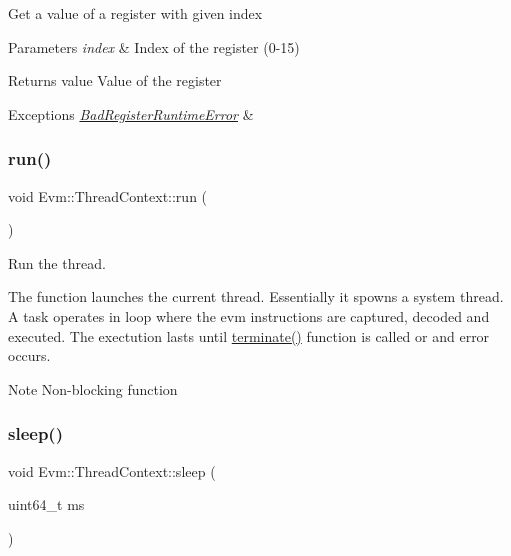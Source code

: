 Get a value of a register with given index 
\begin{DoxyParams}{Parameters}
{\em index} & Index of the register (0-\/15) \\
\hline
\end{DoxyParams}
\begin{DoxyReturn}{Returns}
value Value of the register 
\end{DoxyReturn}

\begin{DoxyExceptions}{Exceptions}
{\em \mbox{\hyperlink{struct_evm_1_1_bad_register_runtime_error}{Bad\+Register\+Runtime\+Error}}} & \\
\hline
\end{DoxyExceptions}
\mbox{\label{struct_evm_1_1_thread_context_a1783f0f6cd523e7dc161bda3bfc1da91}} 
\subsubsection{\texorpdfstring{run()}{run()}}
{\footnotesize\ttfamily void Evm\+::\+Thread\+Context\+::run (\begin{DoxyParamCaption}{ }\end{DoxyParamCaption})}



Run the thread. 

The function launches the current thread. Essentially it spowns a system thread. A task operates in loop where the evm instructions are captured, decoded and executed. The exectution lasts until \mbox{\hyperlink{struct_evm_1_1_thread_context_aed1e36bdf15b042767c1301d5901ba6c}{terminate()}} function is called or and error occurs. \begin{DoxyNote}{Note}
Non-\/blocking function 
\end{DoxyNote}
\mbox{\label{struct_evm_1_1_thread_context_a4f9e4331dffb52e0165c3ffc27ca1421}} 
\subsubsection{\texorpdfstring{sleep()}{sleep()}}
{\footnotesize\ttfamily void Evm\+::\+Thread\+Context\+::sleep (\begin{DoxyParamCaption}\item[{uint64\+\_\+t}]{ms }\end{DoxyParamCaption})}




